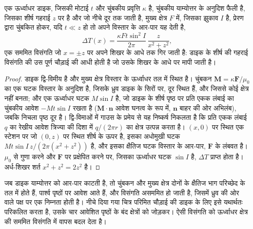 \begin{proposition}[पतली डाइक की विसंगति]\label{prop:b3:field-lab-methods-3:dyke}
एक ऊर्ध्वाधर डाइक, जिसकी मोटाई $t$ और चुंबकीय प्रवृत्ति $\kappa$ है, चुंबकीय याम्योत्तर
के अनुदिश फैली है, जिसका शीर्ष गहराई $z$ पर है और जो नीचे दूर तक जाती है,
मुख्य क्षेत्र $F$ में, जिसका झुकाव $I$ है, प्रेरण द्वारा चुंबकित होकर,
यदि $t \ll z$ हो तो अपने विस्तार के आर-पार यह देती है,
\[
\Delta T(x) = \frac{\kappa F t\sin^2 I}{2\pi}\,\frac{z}{x^2 + z^2} ,
\]
एक सममित विसंगति जो $x = \pm z$ पर अपने शिखर के आधे तक गिर जाती है: डाइक के
शीर्ष की गहराई विसंगति की उस पूर्ण चौड़ाई की आधी होती है जो उसके शिखर के आधे पर
मापी जाती है।
\end{proposition}

\begin{proof}
डाइक द्वि-विमीय है और मुख्य क्षेत्र विस्तार के
ऊर्ध्वाधर तल में स्थित है। चुंबकन $\mathbf{M} = \kappa\mathbf{F}/\mu_0$
का एक घटक विस्तार के अनुदिश है, जिसके ध्रुव डाइक के
सिरों पर, दूर स्थित हैं, और जिससे कोई क्षेत्र नहीं बनता; और एक ऊर्ध्वाधर घटक $M
\sin I$ है, जो डाइक के शीर्ष पृष्ठ पर प्रति एकक लंबाई का चुंबकीय आवेश
$-Mt\sin I$ रखता है ($\mathbf{M}\cdot\mathbf{n}$ आवेश घनत्व के रूप में, $\mathbf{n}$ बाहर की ओर
अभिलंब), जबकि निचला पृष्ठ
दूर है। द्वि-विमाओं में गाउस के प्रमेय से यह निष्कर्ष निकलता है कि प्रति एकक लंबाई $q$ का रेखीय आवेश
त्रिज्या की दिशा में $q/(2\pi r)$ का क्षेत्र उत्पन्न करता है। $(x, 0)$ पर स्थित एक स्टेशन पर
जो $(0, z)$ पर स्थित शीर्ष के ऊपर है, इसका अधोमुखी घटक
$Mt\sin I\,z/(2\pi(x^2 + z^2))$ है, और इसका क्षैतिज घटक
विस्तार के आर-पार, $\mathbf{F}$ के लंबवत है। $\mu_0$ से गुणा करने और
$\mathbf{F}$ पर प्रक्षेपित करने पर, जिसका ऊर्ध्वाधर घटक
$\sin I$ है, $\Delta T$ प्राप्त होता है। अर्ध-शिखर शर्त $x^2 + z^2 =
2z^2$ है।
\end{proof}

जब डाइक याम्योत्तर को आर-पार काटती है, तो चुंबकन और मुख्य क्षेत्र दोनों के
क्षैतिज भाग परिच्छेद के तल में होते हैं,
पार्श्व पृष्ठों पर आवेश आते हैं, और विसंगति
असममित हो जाती है, जिसमें ध्रुव की ओर वाले पक्ष पर एक निम्नता होती है। नीचे दिया गया चित्र
परिमित चौड़ाई की डाइक के लिए इसे यथार्थतः परिकलित करता है, उसके चार आवेशित पृष्ठों के
बंद क्षेत्रों को जोड़कर।  ऐसी
विसंगति को ऊर्ध्वाधर क्षेत्र की सममित विसंगति में वापस बदल देता है।

